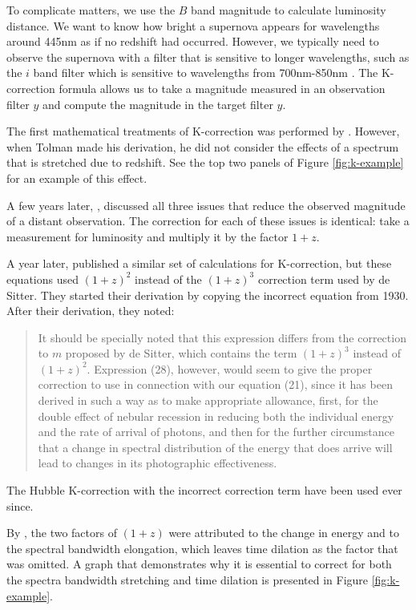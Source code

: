 \documentclass[linenumbers]{aastex631}
\begin{document}
To complicate matters, we use the $B$ band magnitude to calculate luminosity
distance. We want to know how bright a supernova appears for wavelengths around
445nm as if no redshift had occurred. However, we typically need to observe the
supernova with a filter that is sensitive to longer wavelengths, such as the
$i$ band filter which is sensitive to wavelengths from 700nm-850nm
\citep{flaugher2015}. The K-correction formula allows us to take a magnitude
measured in an observation filter $y$ and compute the magnitude in the target
filter $y$.

The first mathematical treatments of K-correction was performed by
\citet{tolman1930}. However, when Tolman made his derivation, he did not
consider the effects of a spectrum that is stretched due to redshift. See
the top two panels of Figure \ref{fig:k-example} for an example of this effect.

A few years later, \citet{desitter1934}, discussed all three issues that reduce
the observed magnitude of a distant observation. The correction for each of
these issues is identical: take a measurement for luminosity and multiply it by
the factor $1 + z$.

A year later, \citet{hubble1935} published a similar set of calculations for
K-correction, but these equations used $(1 + z)^2$ instead of the $(1 + z)^3$
correction term used by de Sitter. They started their derivation by copying the
incorrect equation from 1930. After their derivation, they noted:

\begin{quote}
It should be specially noted that this expression differs from the correction
to $m$ proposed by de Sitter, which contains the term $(1 + z)^3$ instead of
$(1 + z)^2$. Expression (28), however, would seem to give the proper correction
to use in connection with our equation (21), since it has been derived in such
a way as to make appropriate allowance, first, for the double effect of nebular
recession in reducing both the individual energy and the rate of arrival of
photons, and then for the further circumstance that a change in spectral
distribution of the energy that does arrive will lead to changes in its
photographic effectiveness.
\end{quote}

The Hubble K-correction with the incorrect correction term have been used ever
since.

By \citet{oke1968}, the two factors of $(1 + z)$ were attributed to the change
in energy and to the spectral bandwidth elongation, which leaves time dilation
as the factor that was omitted. A graph that demonstrates why it is essential to
correct for both the spectra bandwidth stretching and time dilation is presented
in Figure \ref{fig:k-example}.
\end{document}
